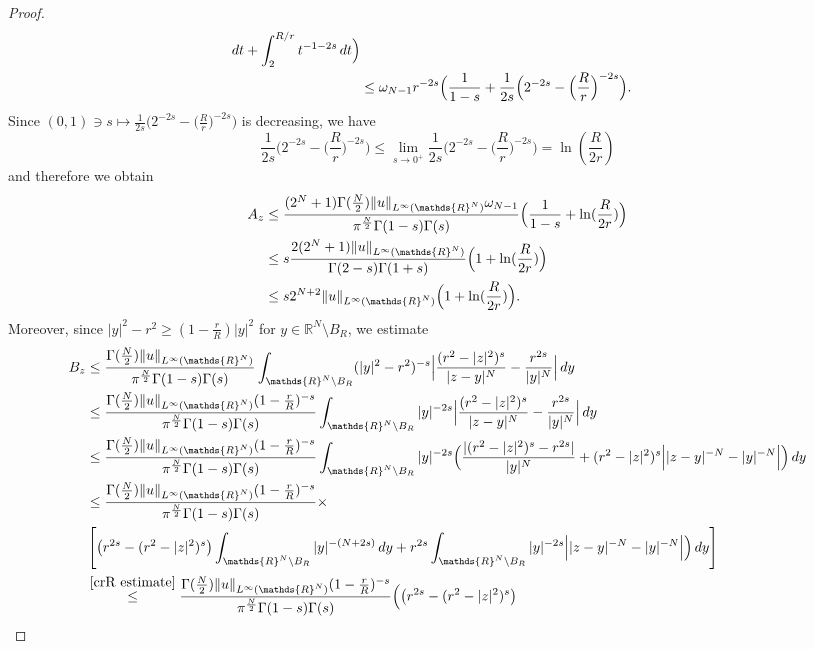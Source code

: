 \documentclass[notitlepage,11pt,reqno]{amsart}
\theoremstyle{definition}
\numberwithin{equation}{section}
\newcommand{\RR}{\mathds{R}}
\begin{document}
\begin{proof}
\begin{align*}
\, dt+\int_2^{R/r}t^{-1-2s}\, dt\Bigr)\\
&\leq \omega_{N-1}r^{-2s}\Bigl(\frac{1}{1-s}+\frac{1}{2s}\Big(2^{-2s}-\Big(\frac{R}{r}\Big)^{-2s}\Bigr).
\end{align*}
Since $(0,1)\ni s\mapsto \frac{1}{2s}\Big(2^{-2s}-\Big(\frac{R}{r}\Big)^{-2s}\Bigr)$ is decreasing, we have
$$
\frac{1}{2s}\Big(2^{-2s}-\Big(\frac{R}{r}\Big)^{-2s}\Bigr)\leq \lim_{s\to 0^+} \frac{1}{2s}\Big(2^{-2s}-\Big(\frac{R}{r}\Big)^{-2s}\Bigr)=\ln(\frac{R}{2r})
$$
and therefore we obtain
\begin{align*}
A_z &\le \frac{(2^N+1) \Gamma(\frac{N}{2})\|u\|_{L^\infty(\RR^N)}\omega_{N-1}}{\pi^{\frac{N}{2}}\Gamma(1-s)\Gamma(s)}\Bigl(\frac{1}{1-s}+\ln(\frac{R}{2r})\Bigr)\\
&\le s \frac{2(2^{N} +1)\|u\|_{L^\infty(\RR^N)}}{ \Gamma(2-s)\Gamma(1+s)}\Bigl(1+\ln(\frac{R}{2r})\Bigr)\\
&\le s  2^{N+2}\|u\|_{L^\infty(\RR^N)} \Bigl(1+\ln(\frac{R}{2r})\Bigr).
\end{align*}
Moreover, since $|y|^2-r^2 \ge (1-\frac{r}{R})|y|^2$ for $y \in \RR^N \setminus B_R$, we estimate
\begin{align*}
  B_z &\le \frac{\Gamma(\frac{N}{2})\|u\|_{L^\infty(\RR^N)}}{\pi^{\frac{N}{2}}\Gamma(1-s)\Gamma(s)}
 \int_{\RR^N \setminus B_R}(|y|^2-r^2)^{-s}  \Bigl| \frac{(r^2-|z|^2)^s}{|z-y|^N}-\frac{r^{2s}}{|y|^N}\Bigr|   \, dy
\\
      &\le \frac{\Gamma(\frac{N}{2})\|u\|_{L^\infty(\RR^N)}(1-\frac{r}{R})^{-s}}{\pi^{\frac{N}{2}}\Gamma(1-s)\Gamma(s)} \int_{\RR^N \setminus B_R}|y|^{-2s}  \Bigl| \frac{(r^2-|z|^2)^s}{|z-y|^N}-\frac{r^{2s}}{|y|^N}\Bigr| \, dy\\  
      &\le \frac{\Gamma(\frac{N}{2})\|u\|_{L^\infty(\RR^N)}(1-\frac{r}{R})^{-s}}{\pi^{\frac{N}{2}}\Gamma(1-s)\Gamma(s)} \int_{\RR^N \setminus B_R}|y|^{-2s} \Bigl(  \frac{|(r^2-|z|^2)^s-r^{2s}|}{|y|^N} + (r^2-|z|^2)^s \Bigl| |z-y|^{-N}-|y|^{-N}\Bigr| \Bigr)\, dy\\  
      &\le \frac{\Gamma(\frac{N}{2})\|u\|_{L^\infty(\RR^N)}(1-\frac{r}{R})^{-s}}{\pi^{\frac{N}{2}}\Gamma(1-s)\Gamma(s)} \times\\
     & \left[ \bigl(r^{2s} - (r^2-|z|^2)^s\bigr)
       \int_{\RR^N \setminus B_R}|y|^{-(N+2s)} \,dy + r^{2s} \int_{\RR^N \setminus B_R} |y|^{-2s} \Bigl| |z-y|^{-N}-|y|^{-N}\Bigr| \Bigr)\, dy\right]\\
        &\overset{\eqref{crR estimate}}{\leq} \frac{\Gamma(\frac{N}{2})\|u\|_{L^\infty(\RR^N)}(1-\frac{r}{R})^{-s}}{\pi^{\frac{N}{2}}\Gamma(1-s)\Gamma(s)}  \Bigl( \bigl(r^{2s} - (r^2-|z|^2)^s\bigr)

\end{align*}
\end{proof}
\end{document}
